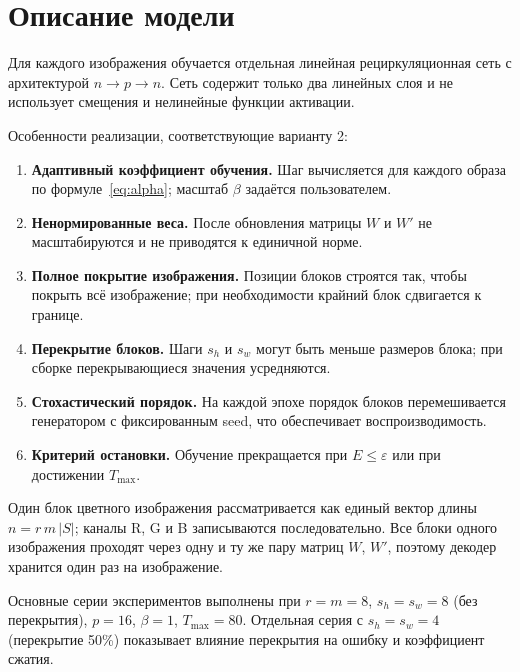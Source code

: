 \section{Описание модели}
\label{sec:model}

Для каждого изображения обучается отдельная линейная рециркуляционная сеть с архитектурой $n \to p \to n$. Сеть содержит только два линейных слоя и не использует смещения и нелинейные функции активации.

Особенности реализации, соответствующие варианту 2:
\begin{enumerate}
	\item \textbf{Адаптивный коэффициент обучения.} Шаг вычисляется для каждого образа по формуле~\eqref{eq:alpha}; масштаб $\beta$ задаётся пользователем.
	\item \textbf{Ненормированные веса.} После обновления матрицы $W$ и $W'$ не масштабируются и не приводятся к единичной норме.
	\item \textbf{Полное покрытие изображения.} Позиции блоков строятся так, чтобы покрыть всё изображение; при необходимости крайний блок сдвигается к границе.
	\item \textbf{Перекрытие блоков.} Шаги $s_h$ и $s_w$ могут быть меньше размеров блока; при сборке перекрывающиеся значения усредняются.
	\item \textbf{Стохастический порядок.} На каждой эпохе порядок блоков перемешивается генератором с фиксированным seed, что обеспечивает воспроизводимость.
	\item \textbf{Критерий остановки.} Обучение прекращается при $E \le \varepsilon$ или при достижении $T_{\max}$.
\end{enumerate}

Один блок цветного изображения рассматривается как единый вектор длины $n=r\,m\,|S|$; каналы R, G и B записываются последовательно. Все блоки одного изображения проходят через одну и ту же пару матриц $W$, $W'$, поэтому декодер хранится один раз на изображение.

Основные серии экспериментов выполнены при $r=m=8$, $s_h=s_w=8$ (без перекрытия), $p=16$, $\beta=1$, $T_{\max}=80$. Отдельная серия с $s_h=s_w=4$ (перекрытие 50\%) показывает влияние перекрытия на ошибку и коэффициент сжатия.
